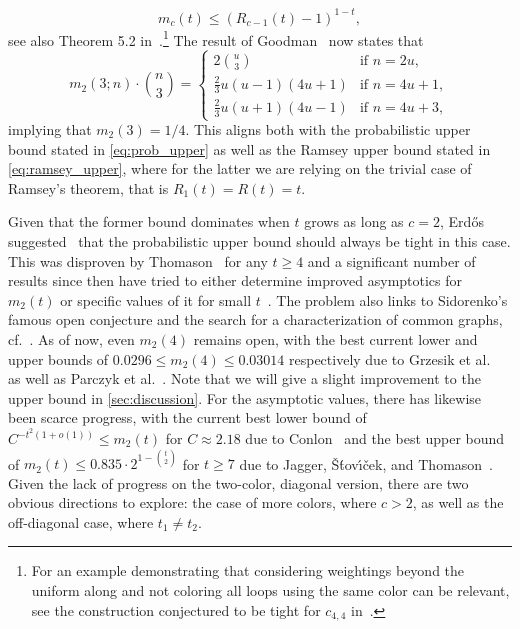 \documentclass[a4paper,11pt]{article}
\numberwithin{equation}{section}
\begin{document}
%
\begin{equation} \label{eq:ramsey_upper}
    m_c(t) \leq (R_{c-1}(t) - 1)^{1-t},
\end{equation}
%
see also Theorem 5.2 in~\cite{fox2008there}.\footnote{For an example demonstrating that considering weightings beyond the uniform along and not coloring all loops using the same color can be relevant, see the construction conjectured to be tight for $c_{4,4}$ in~\cite{pikhurko2013minimum}.}
%
The result of Goodman~\cite{Goodman_1959} now states that
%
\begin{equation}
    m_2(3; n) \cdot {n \choose 3} = \left\{\begin{array}{ll}
        2 {u \choose 3} & \text{if } n = 2u,\\
        \frac{2}{3} u (u-1) (4u+1) & \text{if } n = 4u+1,\\
        \frac{2}{3} u (u+1) (4u-1) & \text{if } n = 4u+3,
        \end{array}\right.
\end{equation}
%
implying that $m_2(3) = 1/4$. This aligns both with the probabilistic upper bound stated in \cref{eq:prob_upper} as well as the Ramsey upper bound stated in \cref{eq:ramsey_upper}, where for the latter we are relying on the trivial case of Ramsey's theorem, that is $R_1(t) = R(t) = t$.

Given that the former bound dominates when $t$ grows as long as $c = 2$, Erd\H{o}s suggested~\cite{Erdos_1962} that the probabilistic upper bound should always be tight in this case. 
This was disproven by Thomason~\cite{Thomason_1989} for any $t \geq 4$ and a significant number of results since then have tried to either determine improved asymptotics for $m_2(t)$ or specific values of it for small $t$~\cite{Conlon_2012,deza2012conjecture,even2015note,Franek_2002,FranekRodl_1993,Giraud_1979,GrzesikEtAl_2020,jagger1996multiplicities,Niess_2012,Sawin_2021,Sperfeld_2011,Thomason_1997, Wolf_2010,ParczykEtAl_2022}. The problem also links to Sidorenko's famous open conjecture and the search for a characterization of common graphs, cf.~\cite{BurrRosta_1980, Sidorenko_1993}. As of now, even $m_2(4)$ remains open, with the best current lower and upper bounds of $0.0296 \leq m_2(4) \leq 0.03014$ respectively due to Grzesik et al.~\cite{GrzesikEtAl_2020} as well as Parczyk et al.~\cite{ParczykEtAl_2022}. Note that we will give a slight improvement to the upper bound in \cref{sec:discussion}. For the asymptotic values, there has likewise been scarce progress, with the current best lower bound of $C^{-t^2 (1 + o(1))} \leq m_2(t)$ for $C \approx 2.18$ due to Conlon~\cite{Conlon_2012} and the best upper bound of $m_2(t) \leq 0.835 \cdot 2^{1-{t\choose 2}}$ for $t \geq 7$ due to Jagger, {\v{S}}{\'t}ov{\'\i}{\v{c}}ek, and Thomason~\cite{jagger1996multiplicities}.
Given the lack of progress on the two-color, diagonal version, there are two obvious directions to explore: the case of more colors, where $c > 2$, as well as the off-diagonal case, where $t_1 \neq t_2$.
\end{document}
